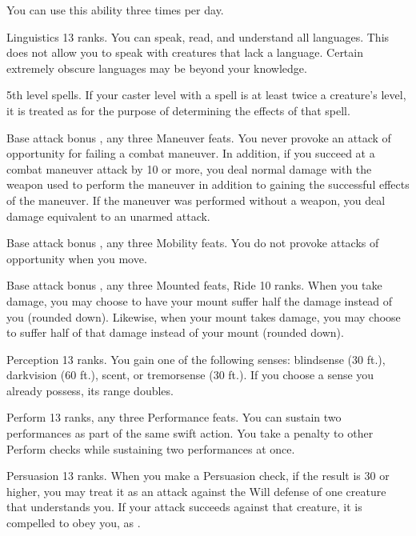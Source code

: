 You can use this ability three times per day.

\featpre Linguistics 13 ranks.
\featben You can speak, read, and understand all languages. This does not allow you to speak with creatures that lack a language. Certain extremely obscure languages may be beyond your knowledge.

\featpre 5th level spells.
\featben If your caster level with a spell is at least twice a creature's level, it is treated as \bloodied for the purpose of determining the effects of that spell.

\featpre Base attack bonus , any three Maneuver feats.
\featben You never provoke an attack of opportunity for failing a combat maneuver. In addition, if you succeed at a combat maneuver attack by 10 or more, you deal normal damage with the weapon used to perform the maneuver in addition to gaining the successful effects of the maneuver. If the maneuver was performed without a weapon, you deal damage equivalent to an unarmed attack.

\featpre Base attack bonus , any three Mobility feats.
\featben You do not provoke attacks of opportunity when you move.

\featpre Base attack bonus , any three Mounted feats, Ride 10 ranks.
\featben When you take damage, you may choose to have your mount suffer half the damage instead of you (rounded down). Likewise, when your mount takes damage, you may choose to suffer half of that damage instead of your mount (rounded down).

\featpre Perception 13 ranks.
\featben You gain one of the following senses: blindsense (30 ft.), darkvision (60 ft.), scent, or tremorsense (30 ft.). If you choose a sense you already possess, its range doubles.

\featpres Perform 13 ranks, any three Performance feats.
\featben You can sustain two performances as part of the same swift action. You take a  penalty to other Perform checks while sustaining two performances at once.

\featpres Persuasion 13 ranks.
\featben When you make a Persuasion check, if the result is 30 or higher, you may treat it as an attack against the Will defense of one creature that understands you. If your attack succeeds against that creature, it is compelled to obey you, as .

